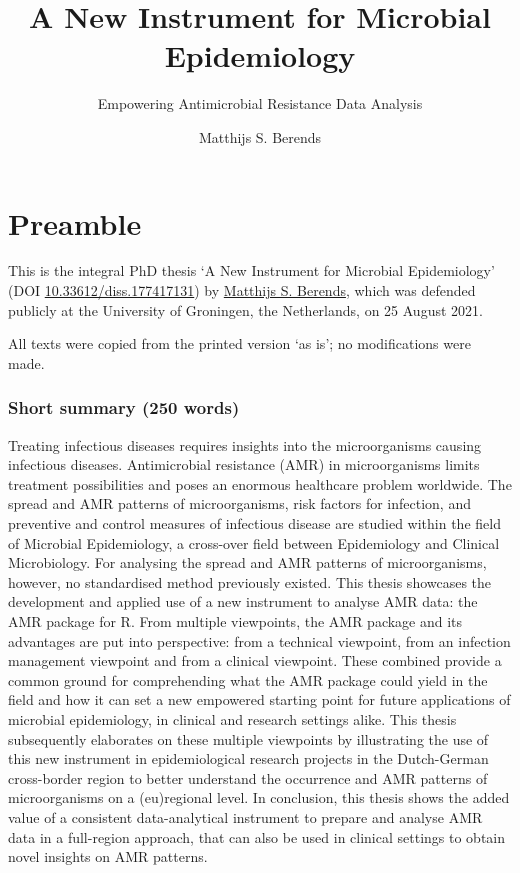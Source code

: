 \documentclass[
]{book}
\title{A New Instrument for Microbial Epidemiology}
\subtitle{Empowering Antimicrobial Resistance Data Analysis}
\author{Matthijs S. Berends}
\date{}
\begin{document}
\maketitle

{
\setcounter{tocdepth}{1}
\tableofcontents
}
\hypertarget{preamble}{%
\chapter*{Preamble}\label{preamble}}

This is the integral PhD thesis `A New Instrument for Microbial Epidemiology' (DOI \href{https://doi.org/10.33612/diss.177417131}{10.33612/diss.177417131}) by \href{https://www.rug.nl/staff/m.s.berends}{Matthijs S. Berends}, which was defended publicly at the University of Groningen, the Netherlands, on 25 August 2021.

All texts were copied from the printed version `as is'; no modifications were made.

\hypertarget{short-summary-250-words}{%
\subsection*{Short summary (250 words)}\label{short-summary-250-words}}

Treating infectious diseases requires insights into the microorganisms causing infectious diseases. Antimicrobial resistance (AMR) in microorganisms limits treatment possibilities and poses an enormous healthcare problem worldwide. The spread and AMR patterns of microorganisms, risk factors for infection, and preventive and control measures of infectious disease are studied within the field of Microbial Epidemiology, a cross-over field between Epidemiology and Clinical Microbiology. For analysing the spread and AMR patterns of microorganisms, however, no standardised method previously existed. This thesis showcases the development and applied use of a new instrument to analyse AMR data: the AMR package for R. From multiple viewpoints, the AMR package and its advantages are put into perspective: from a technical viewpoint, from an infection management viewpoint and from a clinical viewpoint. These combined provide a common ground for comprehending what the AMR package could yield in the field and how it can set a new empowered starting point for future applications of microbial epidemiology, in clinical and research settings alike. This thesis subsequently elaborates on these multiple viewpoints by illustrating the use of this new instrument in epidemiological research projects in the Dutch-German cross-border region to better understand the occurrence and AMR patterns of microorganisms on a (eu)regional level. In conclusion, this thesis shows the added value of a consistent data-analytical instrument to prepare and analyse AMR data in a full-region approach, that can also be used in clinical settings to obtain novel insights on AMR patterns.
\end{document}
